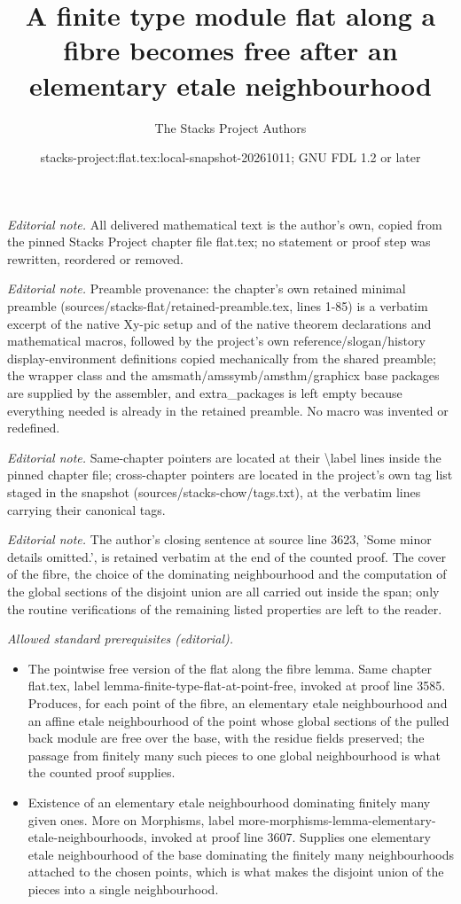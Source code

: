 \documentclass[10pt,a4paper]{amsart}
\title{A finite type module flat along a fibre becomes free after an elementary etale neighbourhood}
\author{The Stacks Project Authors}
\date{stacks-project:flat.tex:local-snapshot-20261011; GNU FDL 1.2 or later}
\theoremstyle{plain}
\theoremstyle{definition}
\theoremstyle{remark}
\numberwithin{equation}{subsection}
\begin{document}
\maketitle
\noindent\textit{Editorial note.} All delivered mathematical text is the author's own, copied from the pinned Stacks Project chapter file flat.tex; no statement or proof step was rewritten, reordered or removed.\par\medskip
\noindent\textit{Editorial note.} Preamble provenance: the chapter's own retained minimal preamble (sources/stacks-flat/retained-preamble.tex, lines 1-85) is a verbatim excerpt of the native Xy-pic setup and of the native theorem declarations and mathematical macros, followed by the project's own reference/slogan/history display-environment definitions copied mechanically from the shared preamble; the wrapper class and the amsmath/amssymb/amsthm/graphicx base packages are supplied by the assembler, and extra\_packages is left empty because everything needed is already in the retained preamble. No macro was invented or redefined.\par\medskip
\noindent\textit{Editorial note.} Same-chapter pointers are located at their \textbackslash{}label lines inside the pinned chapter file; cross-chapter pointers are located in the project's own tag list staged in the snapshot (sources/stacks-chow/tags.txt), at the verbatim lines carrying their canonical tags.\par\medskip
\noindent\textit{Editorial note.} The author's closing sentence at source line 3623, 'Some minor details omitted.', is retained verbatim at the end of the counted proof. The cover of the fibre, the choice of the dominating neighbourhood and the computation of the global sections of the disjoint union are all carried out inside the span; only the routine verifications of the remaining listed properties are left to the reader.\par\medskip
\noindent\textit{Allowed standard prerequisites (editorial).}\begin{itemize}
\item The pointwise free version of the flat along the fibre lemma. Same chapter flat.tex, label lemma-finite-type-flat-at-point-free, invoked at proof line 3585. Produces, for each point of the fibre, an elementary etale neighbourhood and an affine etale neighbourhood of the point whose global sections of the pulled back module are free over the base, with the residue fields preserved; the passage from finitely many such pieces to one global neighbourhood is what the counted proof supplies.
\item Existence of an elementary etale neighbourhood dominating finitely many given ones. More on Morphisms, label more-morphisms-lemma-elementary-etale-neighbourhoods, invoked at proof line 3607. Supplies one elementary etale neighbourhood of the base dominating the finitely many neighbourhoods attached to the chosen points, which is what makes the disjoint union of the pieces into a single neighbourhood.
\end{itemize}\medskip
\end{document}
